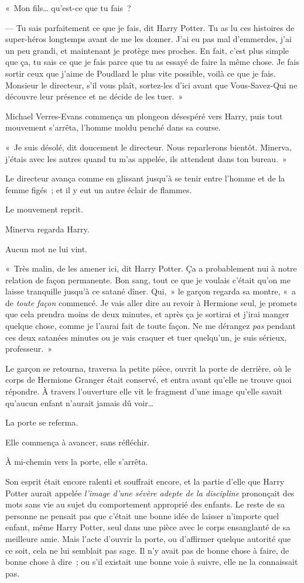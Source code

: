«~Mon fils… qu'est-ce que tu fais~?

--- Tu sais parfaitement ce que je fais, dit Harry Potter.
Tu as lu ces histoires de super-héros longtemps avant de me les donner.
J'ai eu pas mal d'emmerdes, j'ai un peu grandi, et maintenant je protège mes proches.
En fait, c'est plus simple que ça, tu sais ce que je fais parce que tu as essayé de faire la même chose.
Je fais sortir ceux que j'aime de Poudlard le plus vite possible, voilà ce que je fais.
Monsieur le directeur, s'il vous plaît, sortez-les d'ici avant que Vous-Savez-Qui ne découvre leur présence et ne décide de les tuer.~»

Michael Verres-Evans commença un plongeon désespéré vers Harry, puis tout mouvement s'arrêta, l'homme moldu penché dans sa course.

«~Je suis désolé, dit doucement le directeur.
Nous reparlerons bientôt.
Minerva, j'étais avec les autres quand tu m'as appelée, ils attendent dans ton bureau.~»

Le directeur avança comme en glissant jusqu'à se tenir entre l'homme et de la femme figés~; et il y eut un autre éclair de flammes.

Le mouvement reprit.

Minerva regarda Harry.

Aucun mot ne lui vint.

«~Très malin, de les amener ici, dit Harry Potter.
Ça a probablement nui à notre relation de façon permanente.
Bon sang, tout ce que je voulais c'était qu'on me laisse tranquille jusqu'à ce satané dîner.
Qui,~» le garçon regarda sa montre, «~a de \emph{toute façon} commencé.
Je vais aller dire au revoir à Hermione seul, je promets que cela prendra moins de deux minutes, et après ça je sortirai et j'irai manger quelque chose, comme je l'aurai fait de toute façon.
Ne me dérangez \emph{pas} pendant ces deux satanées minutes ou je vais craquer et tuer quelqu'un, je suis sérieux, professeur.~»

Le garçon se retourna, traversa la petite pièce, ouvrit la porte de derrière, où le corps de Hermione Granger était conservé, et entra avant qu'elle ne trouve quoi répondre.
À travers l'ouverture elle vit le fragment d'une image qu'elle savait qu'aucun enfant n'aurait jamais dû voir…

La porte se referma.

Elle commença à avancer, sans réfléchir.

À mi-chemin vers la porte, elle s'arrêta.

Son esprit était encore ralenti et souffrait encore, et la partie d'elle que Harry Potter aurait appelée \emph{l'image d'une sévère adepte de la discipline} prononçait des mots sans vie au sujet du comportement approprié des enfants.
Le reste de sa personne ne pensait pas que c'était une bonne idée de laisser n'importe quel enfant, même Harry Potter, seul dans une pièce avec le corps ensanglanté de sa meilleure amie.
Mais l'acte d'ouvrir la porte, ou d'affirmer quelque autorité que ce soit, cela ne lui semblait pas sage.
Il n'y avait pas de bonne chose à faire, de bonne chose à dire~; ou s'il existait une bonne voie à suivre, elle ne la connaissait pas.

